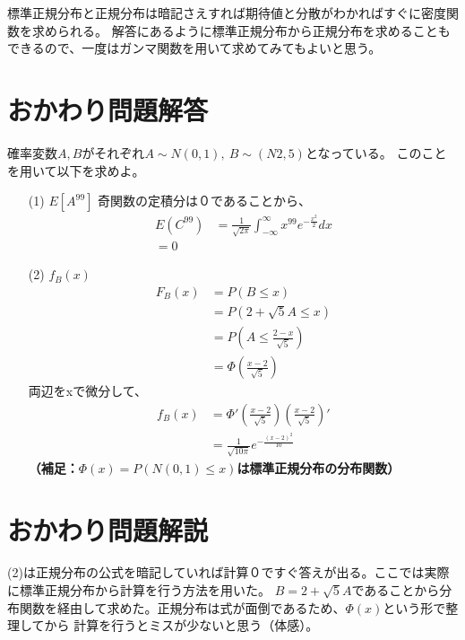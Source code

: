 \documentclass[a4j,uplatex,dvipdfmx]{jsarticle}
\begin{document}
 標準正規分布と正規分布は暗記さえすれば期待値と分散がわかればすぐに密度関数を求められる。
 解答にあるように標準正規分布から正規分布を求めることもできるので、一度はガンマ関数を用いて求めてみてもよいと思う。
  

\newpage
\section*{おかわり問題解答}
確率変数$A,B$がそれぞれ$A\sim N(0,1),~B\sim (N2,5)$となっている。
このことを用いて以下を求めよ。
\begin{itemize}
  \item[(1)] $E[A^{99}]$ 
  奇関数の定積分は０であることから、 
  \begin{equation}
    \begin{split}
      E(C^{99}) &= \frac{1}{\sqrt{2\pi}} \int_{-\infty}^{\infty} x^{99} e^{-\frac{x^2}{2}} dx \\
      =0
    \end{split}
  \end{equation} 
  \item[(2)] $f_B(x)$
   \begin{equation}
     \begin{split}
       F_B(x)&=P(B\le x) \\
       &=P(2+\sqrt{5}A \le x)\\
       &=P\left( A\le \frac{2-x}{\sqrt{5}} \right) \\
       &=\Phi \left( \frac{x-2}{\sqrt{5}} \right) 
     \end{split}
   \end{equation}
   両辺をxで微分して、
   \begin{equation}
     \begin{split}
       f_B(x) &= \Phi' \left( \frac{x-2}{\sqrt{5}} \right) \left( \frac{x-2}{\sqrt{5}} \right)'\\
       &= \frac{1}{\sqrt{10\pi}}e^{-\frac{(x-2)^2}{10}}
     \end{split}
   \end{equation}
   \bf （補足：$\Phi (x)=P(N(0,1)\le x)$は標準正規分布の分布関数）\rm \\ 
\end{itemize}

\section*{おかわり問題解説}
(2)は正規分布の公式を暗記していれば計算０ですぐ答えが出る。ここでは実際に標準正規分布から計算を行う方法を用いた。
$B=2+\sqrt{5}A$であることから分布関数を経由して求めた。正規分布は式が面倒であるため、$\Phi (x)$という形で整理してから
計算を行うとミスが少ないと思う（体感）。
\end{document}

